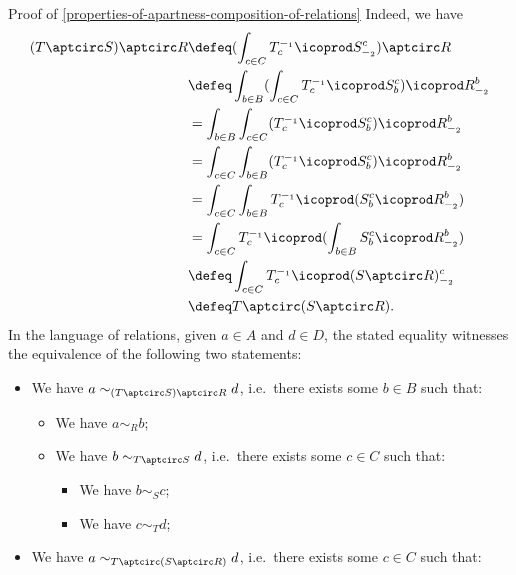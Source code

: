 \begin{Proof}{Proof of \cref{properties-of-apartness-composition-of-relations}}
    Indeed, we have
    \begin{align*}
        (T\aptcirc S)\aptcirc R &\defeq (\int_{c\in C}T^{-_{1}}_{c}\icoprod S^{c}_{-_{2}})\aptcirc R\\
                                &\defeq \int_{b\in B}(\int_{c\in C}T^{-_{1}}_{c}\icoprod S^{c}_{b})\icoprod R^{b}_{-_{2}}\\
                                &=      \int_{b\in B}\int_{c\in C}(T^{-_{1}}_{c}\icoprod S^{c}_{b})\icoprod R^{b}_{-_{2}}\\
                                &=      \int_{c\in C}\int_{b\in B}(T^{-_{1}}_{c}\icoprod S^{c}_{b})\icoprod R^{b}_{-_{2}}\\
                                &=      \int_{c\in C}\int_{b\in B}T^{-_{1}}_{c}\icoprod(S^{c}_{b}\icoprod R^{b}_{-_{2}})\\
                                &=      \int_{c\in C}T^{-_{1}}_{c}\icoprod(\int_{b\in B}S^{c}_{b}\icoprod R^{b}_{-_{2}})\\
                                &\defeq \int_{c\in C}T^{-_{1}}_{c}\icoprod(S\aptcirc R)^{c}_{-_{2}}\\
                                &\defeq T\aptcirc(S\aptcirc R).
    \end{align*}
    In the language of relations, given $a\in A$ and $d\in D$, the stated equality witnesses the equivalence of the following two statements:
    \begin{itemize}
        \item We have $a\sim_{(T\aptcirc S)\aptcirc R}d$, i.e.\ there exists some $b\in B$ such that:
            \begin{itemize}
                \item We have $a\sim_{R}b$;
                \item We have $b\sim_{T\aptcirc S}d$, i.e.\ there exists some $c\in C$ such that:
                    \begin{itemize}
                        \item We have $b\sim_{S}c$;
                        \item We have $c\sim_{T}d$;
                    \end{itemize}
            \end{itemize}
        \item We have $a\sim_{T\aptcirc(S\aptcirc R)}d$, i.e.\ there exists some $c\in C$ such that:
            \begin{itemize}

\end{itemize}
\end{itemize}
\end{Proof}
